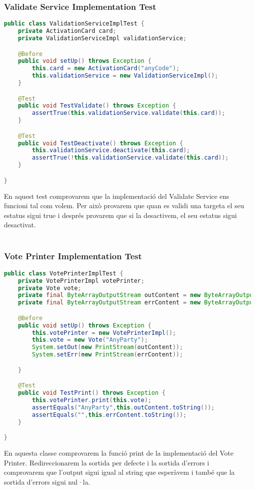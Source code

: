 \documentclass[11pt]{article}
\begin{document}
	\subsubsection{Validate Service Implementation Test}
	\begin{lstlisting}[basicstyle=\ttfamily\scriptsize,language=Java]
public class ValidationServiceImplTest {
    private ActivationCard card;
    private ValidationServiceImpl validationService;

    @Before
    public void setUp() throws Exception {
        this.card = new ActivationCard("anyCode");
        this.validationService = new ValidationServiceImpl();
    }

    @Test
    public void TestValidate() throws Exception {
        assertTrue(this.validationService.validate(this.card));
    }

    @Test
    public void TestDeactivate() throws Exception {
        this.validationService.deactivate(this.card);
        assertTrue(!this.validationService.validate(this.card));
    }

}
	\end{lstlisting}
	En aquest test comprovarem que la implementació del Validate Service ens funcioni tal com volem. Per això provarem que quan es validi una targeta el seu estatus sigui true i després provarem que si la desactivem, el seu estatus sigui desactivat.
	\\\\
	\subsubsection{Vote Printer Implementation Test}
	\begin{lstlisting}[basicstyle=\ttfamily\scriptsize,language=Java]
public class VotePrinterImplTest {
    private VotePrinterImpl votePrinter;
    private Vote vote;
    private final ByteArrayOutputStream outContent = new ByteArrayOutputStream();
    private final ByteArrayOutputStream errContent = new ByteArrayOutputStream();

    @Before
    public void setUp() throws Exception {
        this.votePrinter = new VotePrinterImpl();
        this.vote = new Vote("AnyParty");
        System.setOut(new PrintStream(outContent));
        System.setErr(new PrintStream(errContent));

    }

    @Test
    public void TestPrint() throws Exception {
        this.votePrinter.print(this.vote);
        assertEquals("AnyParty",this.outContent.toString());
        assertEquals("",this.errContent.toString());
    }

}
	\end{lstlisting}
	En aquesta classe comprovarem la funció print de la implementació del Vote Printer. Redireccionarem la sortida per defecte i la sortida d'errors i comprovarem que l'output sigui igual al string que esperàvem i també que la sortida d'errors sigui nul·la.
	\\\\
\end{document}
